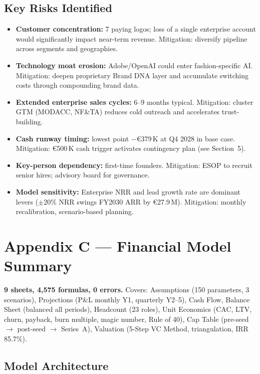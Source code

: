 \documentclass[11pt,a4paper]{article}
\begin{document}
\subsection*{Key Risks Identified}

\begin{itemize}
\item \textbf{Customer concentration:} 7 paying logos; loss of a single enterprise account would significantly impact near-term revenue. Mitigation: diversify pipeline across segments and geographies.
\item \textbf{Technology moat erosion:} Adobe/OpenAI could enter fashion-specific AI. Mitigation: deepen proprietary Brand DNA layer and accumulate switching costs through compounding brand data.
\item \textbf{Extended enterprise sales cycles:} 6--9 months typical. Mitigation: cluster GTM (MODACC, NF\&TA) reduces cold outreach and accelerates trust-building.
\item \textbf{Cash runway timing:} lowest point $-$\euro{}379\,K at Q4 2028 in base case. Mitigation: \euro{}500\,K cash trigger activates contingency plan (see Section~5).
\item \textbf{Key-person dependency:} first-time founders. Mitigation: ESOP to recruit senior hires; advisory board for governance.
\item \textbf{Model sensitivity:} Enterprise NRR and lead growth rate are dominant levers ($\pm$20\% NRR swings FY2030 ARR by \euro{}27.9\,M). Mitigation: monthly recalibration, scenario-based planning.
\end{itemize}

\newpage
\section*{Appendix C --- Financial Model Summary}
\label{app:C}

\textbf{9 sheets, 4,575 formulas, 0 errors.} Covers: Assumptions (150 parameters, 3 scenarios), Projections (P\&L monthly Y1, quarterly Y2--5), Cash Flow, Balance Sheet (balanced all periods), Headcount (23 roles), Unit Economics (CAC, LTV, churn, payback, burn multiple, magic number, Rule of 40), Cap Table (pre-seed $\rightarrow$ post-seed $\rightarrow$ Series~A), Valuation (5-Step VC Method, triangulation, IRR 85.7\%).

\subsection*{Model Architecture}
\end{document}
